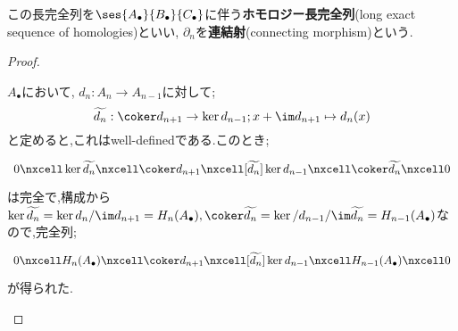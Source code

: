 この長完全列を$\ses{A_\bullet}{B_\bullet}{C_\bullet}$に伴う\textbf{ホモロジー長完全列}(long exact sequence of homologies)といい, $\partial_n$を\textbf{連結射}(connecting morphism)という.

\begin{proof}
	\begin{step}
		\item 
		
		$A_\bullet$において, $d_n:A_n\to A_{n-1}$に対して;
		\[\widetilde{d_n}:\coker d_{n+1}\to\ker d_{n-1};x+\im d_{n+1}\mapsto d_n(x)\]
		と定めると,これはwell-definedである.このとき;
		\[\begin{tikzcd}
		0\nxcell\ker\widetilde{d_n}\nxcell\coker d_{n+1}\nxcell[\widetilde{d_n}]\ker d_{n-1}\nxcell\coker\widetilde{d_n}\nxcell0
		\end{tikzcd}\]
		は完全で,構成から$\ker\widetilde{d_n}=\ker d_n/\im d_{n+1}=H_n(A_\bullet),\coker\widetilde{d_n}=\ker/d_{n-1}/\im\widetilde{d_n}=H_{n-1}(A_\bullet)$なので,完全列;
		\[\begin{tikzcd}
		0\nxcell H_n(A_\bullet)\nxcell\coker d_{n+1}\nxcell[\widetilde{d_n}]\ker d_{n-1}\nxcell H_{n-1}(A_\bullet)\nxcell0
		\end{tikzcd}\]
		が得られた.
		
		\item 
		

\end{step}
\end{proof}
